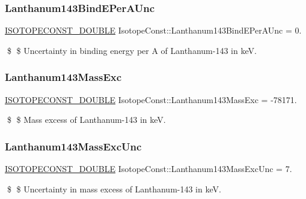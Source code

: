 \subsubsection{\texorpdfstring{Lanthanum143\+Bind\+E\+Per\+A\+Unc}{Lanthanum143BindEPerAUnc}}
{\footnotesize\ttfamily \mbox{\hyperlink{group___isotope_const-_macros_ga8f45a7272ce02c0b4c65c44636ed719a}{I\+S\+O\+T\+O\+P\+E\+C\+O\+N\+S\+T\+\_\+\+D\+O\+U\+B\+LE}} Isotope\+Const\+::\+Lanthanum143\+Bind\+E\+Per\+A\+Unc = 0.}

\$ \$ Uncertainty in binding energy per A of Lanthanum-\/143 in keV. \mbox{\label{group___isotope_const-_lanthanum-_la143_gad844c071ea10fefeed058aa4b1436223}} 
\subsubsection{\texorpdfstring{Lanthanum143\+Mass\+Exc}{Lanthanum143MassExc}}
{\footnotesize\ttfamily \mbox{\hyperlink{group___isotope_const-_macros_ga8f45a7272ce02c0b4c65c44636ed719a}{I\+S\+O\+T\+O\+P\+E\+C\+O\+N\+S\+T\+\_\+\+D\+O\+U\+B\+LE}} Isotope\+Const\+::\+Lanthanum143\+Mass\+Exc = -\/78171.}

\$ \$ Mass excess of Lanthanum-\/143 in keV. \mbox{\label{group___isotope_const-_lanthanum-_la143_gaf193cbbc7fa55af423bbb8a98a7ef1cd}} 
\subsubsection{\texorpdfstring{Lanthanum143\+Mass\+Exc\+Unc}{Lanthanum143MassExcUnc}}
{\footnotesize\ttfamily \mbox{\hyperlink{group___isotope_const-_macros_ga8f45a7272ce02c0b4c65c44636ed719a}{I\+S\+O\+T\+O\+P\+E\+C\+O\+N\+S\+T\+\_\+\+D\+O\+U\+B\+LE}} Isotope\+Const\+::\+Lanthanum143\+Mass\+Exc\+Unc = 7.}

\$ \$ Uncertainty in mass excess of Lanthanum-\/143 in keV. \mbox{\label{group___isotope_const-_lanthanum-_la143_ga2eb59a389488081e4fec46adb087b927}} 
